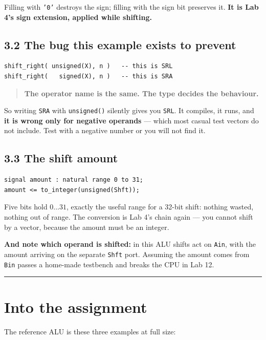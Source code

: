 \documentclass[11pt]{article}
\newcommand{\code}[1]{\texttt{#1}}
\newcommand{\hr}{\vspace{2pt}\hrule\vspace{6pt}}
\begin{document}
Filling with \code{'0'} destroys the sign; filling with the sign bit preserves it.
\textbf{It is Lab 4's sign extension, applied while shifting.}

\subsection*{3.2 The bug this example exists to prevent}

\begin{lstlisting}
shift_right( unsigned(X), n )   -- this is SRL
shift_right(   signed(X), n )   -- this is SRA
\end{lstlisting}

\begin{quote}
\textbf{The operator name is the same. The type decides the behaviour.}
\end{quote}

So writing \code{SRA} with \code{unsigned()} silently gives you \code{SRL}. It
compiles, it runs, and \textbf{it is wrong only for negative operands} --- which
most casual test vectors do not include. Test with a negative number or you will
not find it.

\subsection*{3.3 The shift amount}

\begin{lstlisting}
signal amount : natural range 0 to 31;
amount <= to_integer(unsigned(Shft));
\end{lstlisting}

Five bits hold $0 \ldots 31$, exactly the useful range for a 32-bit shift:
nothing wasted, nothing out of range. The conversion is Lab 4's chain again ---
you cannot shift by a vector, because the amount must be an integer.

\textbf{And note which operand is shifted:} in this ALU shifts act on \code{Ain},
with the amount arriving on the separate \code{Shft} port. Assuming the amount
comes from \code{Bin} passes a home-made testbench and breaks the CPU in Lab 12.

\vspace{4pt}\hr

\section*{Into the assignment}

The reference ALU is these three examples at full size:
\end{document}
